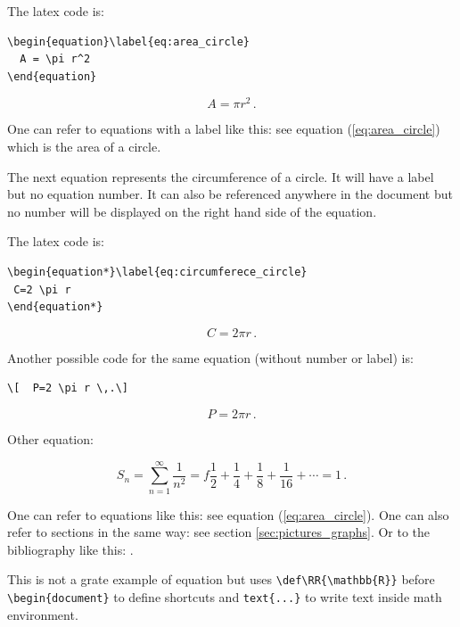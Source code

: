 \documentclass[12pt,a4paper]{article}
\theoremstyle{definition}
\theoremstyle{remark}
\def\RR{\mathbb{R}}
\begin{document}
The latex code is:
\begin{verbatim}
\begin{equation}\label{eq:area_circle}
  A = \pi r^2  
\end{equation}
\end{verbatim}

\begin{equation}\label{eq:area_circle}
  A = \pi r^2  \,.
\end{equation}

One can refer to equations with a label like this: see equation (\ref{eq:area_circle}) which is the area of a circle.

The next equation represents the circumference of a circle. It will have a label but no equation number. It can also be referenced anywhere in the document but no number will be displayed on the right hand side of the equation.

The latex code is:
\begin{verbatim}
\begin{equation*}\label{eq:circumferece_circle}
 C=2 \pi r
\end{equation*}
\end{verbatim}

\begin{equation*}\label{eq:circumferece_circle}
 C=2 \pi r \,.
\end{equation*}
 
 Another possible code for the same equation (without number or label) is:
 \begin{verbatim}
\[  P=2 \pi r \,.\]
\end{verbatim}

\[  P=2 \pi r \,.\]

Other equation:

\begin{equation}\label{eq:infsum_1_n}
S_n = \sum_{n=1}^{\infty} \frac{1}{n^2}
    = f\frac{1}{2}+\frac{1}{4}+\frac{1}{8}+\frac{1}{16}+\cdots
    = 1 \,.
\end{equation}

One can refer to equations like this: see equation (\ref{eq:area_circle}). One can also
refer to sections in the same way: see section \ref{sec:pictures_graphs}. Or
to the bibliography like this: \cite{Someone2000}.

This is not a grate example of equation but uses \verb-\def\RR{\mathbb{R}}- before \verb-\begin{document}- to define shortcuts and \verb-text{...}- to write text inside math environment.
\end{document}
